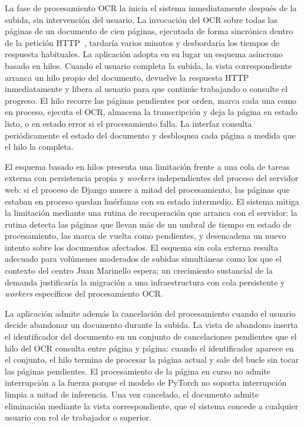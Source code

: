 La fase de procesamiento OCR la inicia el sistema inmediatamente después de la subida, sin intervención del usuario. La invocación del OCR sobre todas las páginas de un documento de cien páginas, ejecutada de forma sincrónica dentro de la petición HTTP~\cite{ietf2022http}, tardaría varios minutos y desbordaría los tiempos de respuesta habituales. La aplicación adopta en su lugar un esquema asíncrono basado en hilos. Cuando el usuario completa la subida, la vista correspondiente arranca un hilo propio del documento, devuelve la respuesta HTTP inmediatamente y libera al usuario para que continúe trabajando o consulte el progreso. El hilo recorre las páginas pendientes por orden, marca cada una como en proceso, ejecuta el OCR, almacena la transcripción y deja la página en estado listo, o en estado error si el procesamiento falla. La interfaz consulta periódicamente el estado del documento y desbloquea cada página a medida que el hilo la completa.

El esquema basado en hilos presenta una limitación frente a una cola de tareas externa con persistencia propia y \textit{workers} independientes del proceso del servidor web: si el proceso de Django muere a mitad del procesamiento, las páginas que estaban en proceso quedan huérfanas con su estado intermedio. El sistema mitiga la limitación mediante una rutina de recuperación que arranca con el servidor: la rutina detecta las páginas que llevan más de un umbral de tiempo en estado de procesamiento, las marca de vuelta como pendientes, y desencadena un nuevo intento sobre los documentos afectados. El esquema sin cola externa resulta adecuado para volúmenes moderados de subidas simultáneas como los que el contexto del centro Juan Marinello espera; un crecimiento sustancial de la demanda justificaría la migración a una infraestructura con cola persistente y \textit{workers} específicos del procesamiento OCR.

La aplicación admite además la cancelación del procesamiento cuando el usuario decide abandonar un documento durante la subida. La vista de abandono inserta el identificador del documento en un conjunto de cancelaciones pendientes que el hilo del OCR consulta entre página y página: cuando el identificador aparece en el conjunto, el hilo termina de procesar la página actual y sale del bucle sin tocar las páginas pendientes. El procesamiento de la página en curso no admite interrupción a la fuerza porque el modelo de PyTorch no soporta interrupción limpia a mitad de inferencia. Una vez cancelado, el documento admite eliminación mediante la vista correspondiente, que el sistema concede a cualquier usuario con rol de trabajador o superior.

